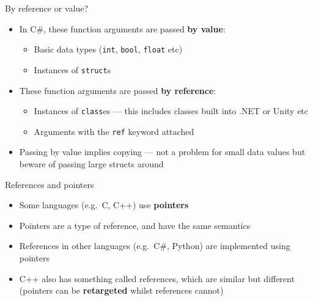 \begin{frame}{By reference or value?}
    \begin{itemize}
		\pause\item In C\#, these function arguments are passed \textbf{by value}:
			\begin{itemize}
				\pause\item Basic data types (\lstinline{int}, \lstinline{bool}, \lstinline{float} etc)
				\pause\item Instances of \lstinline{struct}s
			\end{itemize}
		\pause\item These function arguments are passed \textbf{by reference}:
			\begin{itemize}
				\pause\item Instances of \lstinline{class}es --- this includes classes built into .NET or Unity etc
				\pause\item Arguments with the \lstinline{ref} keyword attached
			\end{itemize}
		\pause\item Passing by value implies copying --- not a problem for small data values but beware of passing large structs around
    \end{itemize}
\end{frame}

\begin{frame}{References and pointers}
    \begin{itemize}
        \pause\item Some languages (e.g.\ C, C++) use \textbf{pointers}
        \pause\item Pointers are a type of reference, and have the same semantics
        \pause\item References in other languages (e.g.\ C\#, Python) are implemented using pointers
        \pause\item C++ also has something called references, which are similar but different
            (pointers can be \textbf{retargeted} whilst references cannot)
    \end{itemize}
\end{frame}

